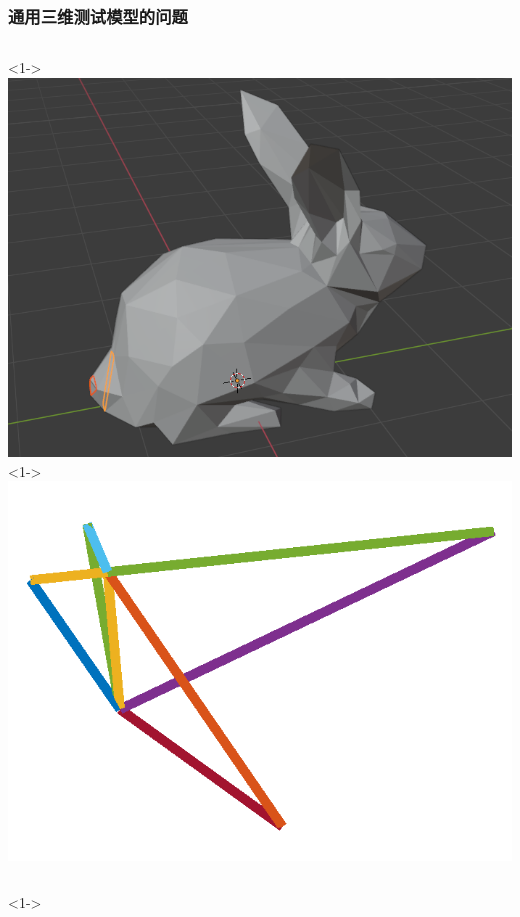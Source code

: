 \documentclass[UTF8]{ctexbeamer}	%
\theoremstyle{plain}
\theoremstyle{definition}
\theoremstyle{remark}
\numberwithin{equation}{section}
\begin{document}
\begin{frame}
\end{frame}

\begin{frame}
    \frametitle{通用三维测试模型的问题}
    \begin{columns}
        <1->
        \includegraphics[width = \textwidth]{fig/rabbit1.png}
        <1->
        \includegraphics[width = \textwidth]{fig/rabbit2.png}
    \end{columns}
    \begin{columns}
        <1->

\end{columns}
\end{frame}
\end{document}
